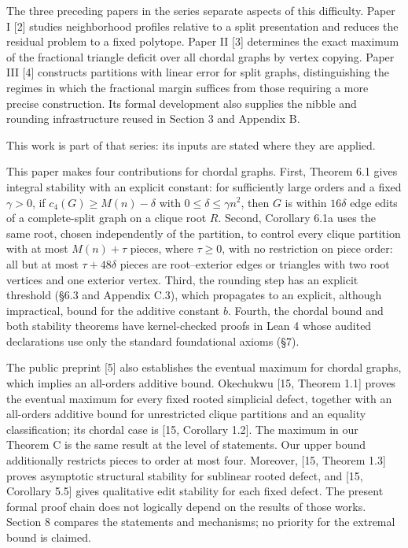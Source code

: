 \documentclass[english,11pt,a4paper]{article}
\begin{document}
The three preceding papers in the series separate aspects of this difficulty. Paper I {[}2{]} studies neighborhood profiles relative to a split presentation and reduces the residual problem to a fixed polytope. Paper II {[}3{]} determines the exact maximum of the fractional triangle deficit over all chordal graphs by vertex copying. Paper III {[}4{]} constructs partitions with linear error for split graphs, distinguishing the regimes in which the fractional margin suffices from those requiring a more precise construction. Its formal development also supplies the nibble and rounding infrastructure reused in Section 3 and Appendix B.

This work is part of that series: its inputs are stated where they are applied.

This paper makes four contributions for chordal graphs. First, Theorem 6.1 gives integral stability with an explicit constant: for sufficiently large orders and a fixed \(\gamma>0\), if \(c_4(G)\ge M(n)-\delta\) with \(0\le\delta\le\gamma n^2\), then \(G\) is within \(16\delta\) edge edits of a complete-split graph on a clique root \(R\). Second, Corollary 6.1a uses the same root, chosen independently of the partition, to control every clique partition with at most \(M(n)+\tau\) pieces, where \(\tau\ge0\), with no restriction on piece order: all but at most \(\tau+48\delta\) pieces are root--exterior edges or triangles with two root vertices and one exterior vertex. Third, the rounding step has an explicit threshold (§6.3 and Appendix C.3), which propagates to an explicit, although impractical, bound for the additive constant \(b\). Fourth, the chordal bound and both stability theorems have kernel-checked proofs in Lean 4 whose audited declarations use only the standard foundational axioms (§7).

The public preprint {[}5{]} also establishes the eventual maximum for chordal graphs, which implies an all-orders additive bound. Okechukwu {[}15, Theorem 1.1{]} proves the eventual maximum for every fixed rooted simplicial defect, together with an all-orders additive bound for unrestricted clique partitions and an equality classification; its chordal case is {[}15, Corollary 1.2{]}. The maximum in our Theorem C is the same result at the level of statements. Our upper bound additionally restricts pieces to order at most four. Moreover, {[}15, Theorem 1.3{]} proves asymptotic structural stability for sublinear rooted defect, and {[}15, Corollary 5.5{]} gives qualitative edit stability for each fixed defect. The present formal proof chain does not logically depend on the results of those works. Section 8 compares the statements and mechanisms; no priority for the extremal bound is claimed.
\end{document}

